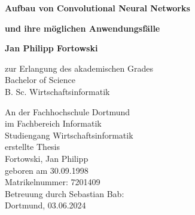 \begin{titlepage}
   \begin{center}
       \vspace*{1cm}

       \Large
       \textbf{Aufbau von Convolutional Neural Networks}
	
	\large
       \vspace{0.5cm}
       \textbf{und ihre möglichen Anwendungsfälle}
            
       \normalsize
	
       \vspace{1.5cm}

       \textbf{Jan Philipp Fortowski}

       \vfill
            
       zur Erlangung des akademischen Grades\\
	   Bachelor of Science\\
	   B. Sc. Wirtschaftsinformatik \\
            
       \vspace{0.8cm}
     
        
       	An der Fachhochschule Dortmund\\
	im Fachbereich Informatik\\
	Studiengang Wirtschaftsinformatik\\
	erstellte Thesis\\
	\vspace{0.5cm}
	Fortowski, Jan Philipp\\
	geboren am 30.09.1998\\
	Matrikelnummer: 7201409\\
	Betreuung durch Sebastian Bab:\\
	\vspace{0.5cm}
	Dortmund, 03.06.2024 \\

            
   \end{center}
\end{titlepage}
